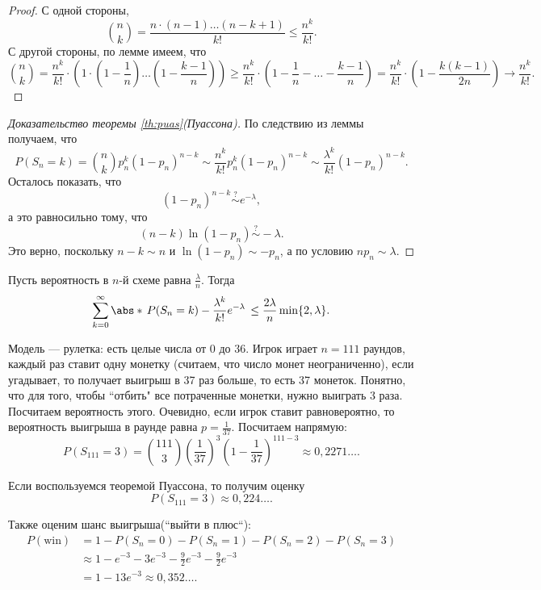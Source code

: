      \begin{proof}
     С одной стороны,
         $$\binom{n}{k} = \frac{n\cdot(n - 1) \ldots (n - k + 1)}{k!} \le \frac{n^k}{k!}.$$
С другой стороны, по лемме имеем, что
$$\binom{n}{k} = \frac{n^k}{k!}\cdot(1\cdot (1 - \frac{1}{n})\ldots(1 - \frac{k - 1}{n}))
             \ge \frac{n^k}{k!}\cdot (1 - \frac{1}{n} - \ldots - \frac{k -1}{n}) = \frac{n^k}{k!}\cdot (1 - \frac {k(k - 1)}{2n})
             \rightarrow \frac{n^k}{k!}.$$
     \end{proof}
 
 \begin{proof}[Доказательство теоремы \ref{th:puas}(Пуассона)]
    По следствию из леммы получаем, что
     $$P(S_n = k) = \binom{n}{k}p_n^k(1-p_n)^{n - k} \sim \frac{n^k}{k!}p_n^k(1-p_n)^{n - k} \sim
         \frac{\lambda^k}{k!}(1 - p_n)^{n - k}.$$
    Осталось показать, что
     $$(1 - p_n)^{n - k} \overset{?}{\sim} e^{-\lambda},$$
     а это равносильно тому, что
     $$(n - k)\ln(1-p_n) \overset{?}{\sim} -\lambda.$$
    Это верно, поскольку $n - k \sim n$ и $\ln(1-p_n) \sim -p_n$, а по условию $np_n \sim \lambda$.
 \end{proof}

 \begin{theorem}[Прохорова]
 Пусть вероятность в $n$-й схеме равна $\frac{\lambda}{n}$. Тогда
     $$\sum_{k = 0}^\infty \abs*{\, P(S_n = k) - \frac{\lambda^k}{k!}e^{-\lambda}\,} \le \frac{2\lambda}{n}\min\{2, \lambda\}.$$
 \end{theorem}

 \begin{example} Модель --- рулетка: есть целые числа от $0$ до $36$. Игрок играет $n=111$ раундов, каждый раз ставит одну монетку (считаем, что число монет неограниченно), если угадывает, то получает выигрыш в 37 раз больше, то есть 37 монеток. Понятно, что для того, чтобы ``отбить" все потраченные монетки, нужно выиграть 3 раза. Посчитаем вероятность этого. Очевидно, если игрок ставит равновероятно, то вероятность выигрыша в раунде равна $p=\frac{1}{37}$.
    Посчитаем напрямую:
     $$P(S_{111} = 3) = \binom{111}{3}\left(\frac{1}{37}\right)^3\left(1-\frac{1}{37}\right)^{111-3} \approx 0,2271\ldots.$$ 

     Если воспользуемся теоремой Пуассона, то получим оценку
     $$P(S_{111} = 3) \approx 0,224\ldots.$$
     
    Также оценим шанс выигрыша(``выйти в плюс``):
    \begin{align*}
        P(\text{win}) &= 1 - P(S_n = 0) - P(S_n = 1) - P(S_n = 2) - P(S_n = 3) \\&\approx
         1 - e^{-3} - 3e^{-3} - \frac{9}{2}e^{-3} - \frac{9}{2}e^{-3} \\&= 1 - 13e^{-3}\approx 0,352\ldots.
    \end{align*}
   
 \end{example}

